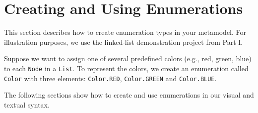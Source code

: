 \newpage
\section{Creating and Using Enumerations}
\genHeader

This section describes how to create enumeration types in your metamodel.
For illustration purposes, we use the linked-list demonstration project from
Part I.

Suppose we want to assign one of several predefined colors (e.g., red, green,
blue) to each \texttt{Node} in a \texttt{List}.
To represent the colors, we create an enumeration called \texttt{Color} with
three elements: \texttt{Color.RED}, \texttt{Color.GREEN} and
\texttt{Color.BLUE}.

The following sections show how to create and use enumerations in our visual and
textual syntax.



